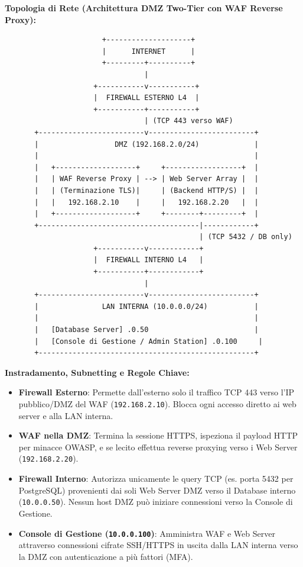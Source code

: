 \documentclass[11pt,a4paper]{article}
\begin{document}
\begin{solutionbox}
\textbf{Topologia di Rete (Architettura DMZ Two-Tier con WAF Reverse Proxy):}
\begin{center}
\begin{verbatim}
                       +--------------------+
                       |      INTERNET      |
                       +---------+----------+
                                 |
                     +-----------v-----------+
                     |  FIREWALL ESTERNO L4  |
                     +-----------+-----------+
                                 | (TCP 443 verso WAF)
       +-------------------------v-------------------------+
       |                  DMZ (192.168.2.0/24)             |
       |                                                   |
       |   +-------------------+     +------------------+  |
       |   | WAF Reverse Proxy | --> | Web Server Array |  |
       |   | (Terminazione TLS)|     | (Backend HTTP/S) |  |
       |   |   192.168.2.10    |     |   192.168.2.20   |  |
       |   +-------------------+     +--------+---------+  |
       +--------------------------------------|------------+
                                              | (TCP 5432 / DB only)
                     +-----------v------------+
                     |  FIREWALL INTERNO L4   |
                     +-----------+------------+
                                 |
       +-------------------------v-------------------------+
       |               LAN INTERNA (10.0.0.0/24)           |
       |                                                   |
       |   [Database Server] .0.50                         |
       |   [Console di Gestione / Admin Station] .0.100     |
       +---------------------------------------------------+
\end{verbatim}
\end{center}

\textbf{Instradamento, Subnetting e Regole Chiave:}
\begin{itemize}
    \item \textbf{Firewall Esterno}: Permette dall'esterno solo il traffico TCP 443 verso l'IP pubblico/DMZ del WAF (\texttt{192.168.2.10}). Blocca ogni accesso diretto ai web server e alla LAN interna.
    \item \textbf{WAF nella DMZ}: Termina la sessione HTTPS, ispeziona il payload HTTP per minacce OWASP, e se lecito effettua reverse proxying verso i Web Server (\texttt{192.168.2.20}).
    \item \textbf{Firewall Interno}: Autorizza unicamente le query TCP (es. porta 5432 per PostgreSQL) provenienti dai soli Web Server DMZ verso il Database interno (\texttt{10.0.0.50}). Nessun host DMZ pu\`o iniziare connessioni verso la Console di Gestione.
    \item \textbf{Console di Gestione (\texttt{10.0.0.100})}: Amministra WAF e Web Server attraverso connessioni cifrate SSH/HTTPS in uscita dalla LAN interna verso la DMZ con autenticazione a pi\`u fattori (MFA).
\end{itemize}
\end{solutionbox}
\end{document}
